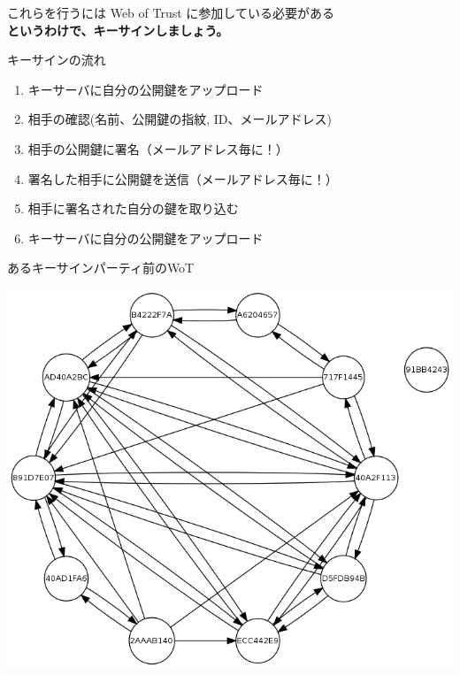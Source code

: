 \begin{frame}
  \begin{center}

これらを行うには Web of Trust に参加している必要がある \\ \pause
\Huge\bfseries 
というわけで、キーサインしましょう。
  \end{center}
\end{frame}

\begin{frame}{キーサインの流れ}
\begin{enumerate}
  \item キーサーバに自分の公開鍵をアップロード
  \item 相手の確認(名前、公開鍵の指紋, ID、メールアドレス)
  \item 相手の公開鍵に署名（メールアドレス毎に！）
  \item 署名した相手に公開鍵を送信（メールアドレス毎に！）
  \item 相手に署名された自分の鍵を取り込む
  \item キーサーバに自分の公開鍵をアップロード
\end{enumerate}
\end{frame}

\begin{frame}{あるキーサインパーティ前のWoT}
\begin{center}
\includegraphics[width=0.8\hsize]{image201111/kof2011-ksp.png}
\end{center}
\end{frame}


